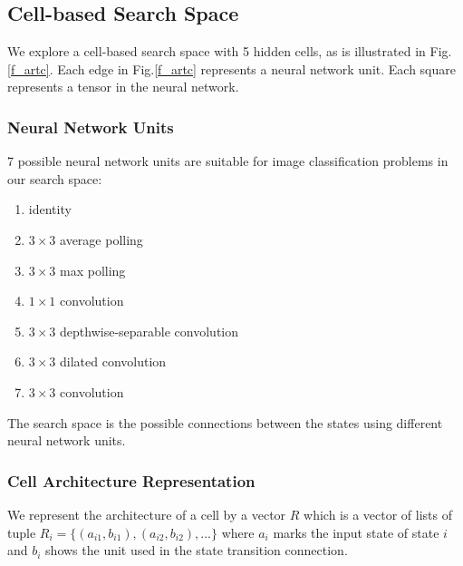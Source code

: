 \documentclass{article}
\begin{document}
\begin{normalsize}
   \subsection{Cell-based Search Space}
 
   We explore a cell-based search space with 5 hidden cells, as is illustrated in Fig.\ref{f_artc}. Each edge in Fig.\ref{f_artc} represents a neural network unit. Each square represents a tensor in the neural network.
 
   \subsubsection{Neural Network Units}
   
   7 possible neural network units are suitable for image classification problems in our search space:
 
       \begin{enumerate}
         \item identity
         \item $3\times3$ average polling
         \item $3\times3$ max polling
         \item $1\times1$ convolution
         \item $3\times3$ depthwise-separable convolution
         \item $3\times3$ dilated convolution
         \item $3\times3$ convolution
       \end{enumerate}
 
   The search space is the possible connections between the states using different neural network units.
 
   \subsubsection{Cell Architecture Representation}
 
   We represent the architecture of a cell by a vector $R$ which is a vector of lists of tuple $R_{i} = \{(a_{i1}, b_{i1}), (a_{i2}, b_{i2}), ...\}$ where $a_i$ marks the input state of state $i$ and $b_i$ shows the unit used in the state transition connection.


\end{normalsize}
\end{document}
